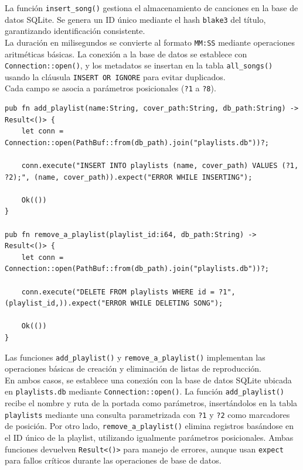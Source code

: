\documentclass[11pt, a4paper]{article}
\begin{document}
            La función \texttt{insert\_song()} gestiona el almacenamiento de canciones en la base de datos SQLite. Se genera un ID único mediante el hash \texttt{blake3} del título, garantizando identificación consistente. \\
            
            La duración en milisegundos se convierte al formato \texttt{MM:SS} mediante operaciones aritméticas básicas. La conexión a la base de datos se establece con \texttt{Connection::open()}, y los metadatos se insertan en la tabla \texttt{all\_songs()} usando la cláusula \texttt{INSERT OR IGNORE} para evitar duplicados. \\
            
            Cada campo se asocia a parámetros posicionales (\texttt{?1} a \texttt{?8}).

            \begin{lstlisting}[caption={Operaciones CRUD playlist}]
pub fn add_playlist(name:String, cover_path:String, db_path:String) -> Result<()> {
    let conn = Connection::open(PathBuf::from(db_path).join("playlists.db"))?;

    conn.execute("INSERT INTO playlists (name, cover_path) VALUES (?1, ?2);", (name, cover_path)).expect("ERROR WHILE INSERTING");

    Ok(())
}

pub fn remove_a_playlist(playlist_id:i64, db_path:String) -> Result<()> {
    let conn = Connection::open(PathBuf::from(db_path).join("playlists.db"))?;

    conn.execute("DELETE FROM playlists WHERE id = ?1",(playlist_id,)).expect("ERROR WHILE DELETING SONG");

    Ok(())
}
            \end{lstlisting}

            Las funciones \texttt{add\_playlist()} y \texttt{remove\_a\_playlist()} implementan las operaciones básicas de creación y eliminación de listas de reproducción. \\
            
            En ambos casos, se establece una conexión con la base de datos SQLite ubicada en \texttt{playlists.db} mediante \texttt{Connection::open()}. La función \texttt{add\_playlist()} recibe el nombre y ruta de la portada como parámetros, insertándolos en la tabla \texttt{playlists} mediante una consulta parametrizada con \texttt{?1} y \texttt{?2} como marcadores de posición. Por otro lado, \texttt{remove\_a\_playlist()} elimina registros basándose en el ID único de la playlist, utilizando igualmente parámetros posicionales. Ambas funciones devuelven \texttt{Result<()>} para manejo de errores, aunque usan \texttt{expect} para fallos críticos durante las operaciones de base de datos.
\end{document}
